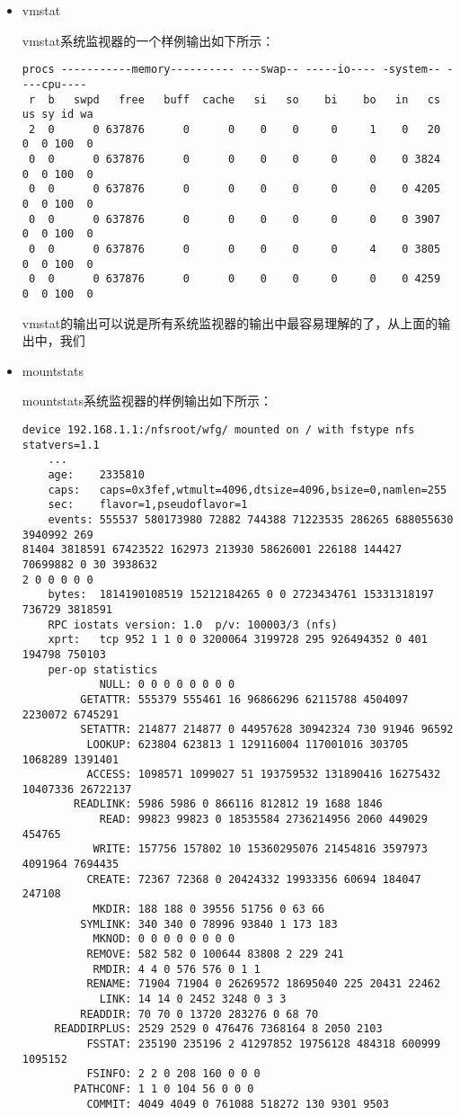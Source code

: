 \begin{itemize}
\item vmstat

vmstat系统监视器的一个样例输出如下所示：
{\footnotesize
\begin{verbatim}
procs -----------memory---------- ---swap-- -----io---- -system-- ----cpu----
 r  b   swpd   free   buff  cache   si   so    bi    bo   in   cs us sy id wa
 2  0      0 637876      0      0    0    0     0     1    0   20  0  0 100  0
 0  0      0 637876      0      0    0    0     0     0    0 3824  0  0 100  0
 0  0      0 637876      0      0    0    0     0     0    0 4205  0  0 100  0
 0  0      0 637876      0      0    0    0     0     0    0 3907  0  0 100  0
 0  0      0 637876      0      0    0    0     0     4    0 3805  0  0 100  0
 0  0      0 637876      0      0    0    0     0     0    0 4259  0  0 100  0
\end{verbatim}
vmstat的输出可以说是所有系统监视器的输出中最容易理解的了，从上面的输出中，我们
}

\item mountstats

mountstats系统监视器的样例输出如下所示：
{\footnotesize
\begin{verbatim}
device 192.168.1.1:/nfsroot/wfg/ mounted on / with fstype nfs statvers=1.1
    ...
    age:    2335810
    caps:   caps=0x3fef,wtmult=4096,dtsize=4096,bsize=0,namlen=255
    sec:    flavor=1,pseudoflavor=1
    events: 555537 580173980 72882 744388 71223535 286265 688055630 3940992 269 
81404 3818591 67423522 162973 213930 58626001 226188 144427 70699882 0 30 3938632 
2 0 0 0 0 0 
    bytes:  1814190108519 15212184265 0 0 2723434761 15331318197 736729 3818591 
    RPC iostats version: 1.0  p/v: 100003/3 (nfs)
    xprt:   tcp 952 1 1 0 0 3200064 3199728 295 926494352 0 401 194798 750103
    per-op statistics
            NULL: 0 0 0 0 0 0 0 0 
         GETATTR: 555379 555461 16 96866296 62115788 4504097 2230072 6745291
         SETATTR: 214877 214877 0 44957628 30942324 730 91946 96592
          LOOKUP: 623804 623813 1 129116004 117001016 303705 1068289 1391401
          ACCESS: 1098571 1099027 51 193759532 131890416 16275432 10407336 26722137
        READLINK: 5986 5986 0 866116 812812 19 1688 1846
            READ: 99823 99823 0 18535584 2736214956 2060 449029 454765
           WRITE: 157756 157802 10 15360295076 21454816 3597973 4091964 7694435
          CREATE: 72367 72368 0 20424332 19933356 60694 184047 247108
           MKDIR: 188 188 0 39556 51756 0 63 66
         SYMLINK: 340 340 0 78996 93840 1 173 183 
           MKNOD: 0 0 0 0 0 0 0 0 
          REMOVE: 582 582 0 100644 83808 2 229 241 
           RMDIR: 4 4 0 576 576 0 1 1 
          RENAME: 71904 71904 0 26269572 18695040 225 20431 22462
            LINK: 14 14 0 2452 3248 0 3 3 
         READDIR: 70 70 0 13720 283276 0 68 70
     READDIRPLUS: 2529 2529 0 476476 7368164 8 2050 2103
          FSSTAT: 235190 235196 2 41297852 19756128 484318 600999 1095152
          FSINFO: 2 2 0 208 160 0 0 0 
        PATHCONF: 1 1 0 104 56 0 0 0 
          COMMIT: 4049 4049 0 761088 518272 130 9301 9503


\end{verbatim}}
\end{itemize}
